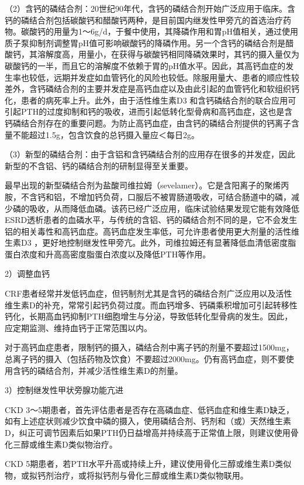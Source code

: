 （2）含钙的磷结合剂：20世纪90年代，含钙的磷结合剂开始广泛应用于临床。含钙的磷结合剂包括碳酸钙和醋酸钙两种，是目前国内继发性甲旁亢的首选治疗药物。碳酸钙的用量为1～6g/d，于餐中使用，其降磷作用和胃pH值相关，通过使用质子泵抑制剂调整胃pH值可影响碳酸钙的降磷作用。另一个含钙的磷结合剂是醋酸钙，其溶解度高，用量小，在获得与碳酸钙相同降磷效果时，其钙的摄入量仅为碳酸钙的一半，而且它的溶解度不依赖于胃的pH值水平。因此，其高钙血症的发生率也较低，远期并发症如血管钙化的风险也较低。除服用量大、患者的顺应性较差外，含钙磷结合剂的主要并发症是高钙血症以及由此引起的血管钙化和软组织钙化，患者的病死率上升。此外，由于活性维生素D{3}
和含钙磷结合剂的联合应用可引起PTH的过度抑制和钙的吸收，进而引起低转化型骨病和高钙血症，这也是含钙磷结合剂存在的重要问题。为防止高钙血症，由含钙的磷结合剂提供的钙离子含量不能超过1.5g，包含饮食的总钙摄入量应＜每日2g。

（3）新型的磷结合剂：由于含铝和含钙磷结合剂的应用存在很多的并发症，因此新型的不含铝、钙的磷结合剂的研制显得至关重要。

最早出现的新型磷结合剂为盐酸司维拉姆（sevelamer）。它是含阳离子的聚烯丙胺，不含钙和铝，不增加钙负荷，口服后不被胃肠道吸收，可结合肠道中的磷，减少磷的吸收，从而降低血磷。该药已经广泛应用，临床试验结果发现它能有效降低ESRD透析患者的血磷水平，与传统的含铝、钙的磷结合剂不同的是，它不会发生铝的相关毒性和高钙血症。高钙血症发生率低，可允许患者使用更大剂量的活性维生素D{3}
，更好地控制继发性甲旁亢。此外，司维拉姆还有显著降低血清低密度脂蛋白浓度和升高高密度脂蛋白浓度以及降低PTH等作用。

2）调整血钙

CRF患者经常并发低钙血症，但钙制剂尤其是含钙的磷结合剂广泛应用以及活性维生素D的补充，常常引起钙负荷过度。而血钙增多、钙磷乘积增加可引起转移性钙化，长期高血钙抑制PTH细胞增生与分泌，导致低转化型骨病的发生。因此，应定期监测、维持血钙于正常范围以内。

对于高钙血症患者，限制钙的摄入，磷结合剂中离子钙的剂量不要超过1500mg，总离子钙的摄入（包括药物及饮食）不要超过2000mg。仍有高钙血症，则不要使用含钙的磷结合剂，并减少活性维生素D的剂量。

3）控制继发性甲状旁腺功能亢进

CKD
3～5期患者，首先评估患者是否存在高磷血症、低钙血症和维生素D缺乏，如有上述症状则减少饮食中磷的摄入，使用磷结合剂、钙剂和（或）天然维生素D，纠正可调节因素后如果PTH仍日益增高并持续高于正常值上限，则建议使用骨化三醇或维生素D类似物治疗。

CKD
5期患者，若PTH水平升高或持续上升，建议使用骨化三醇或维生素D类似物，或拟钙剂治疗，或将拟钙剂与骨化三醇或维生素D类似物联用。

